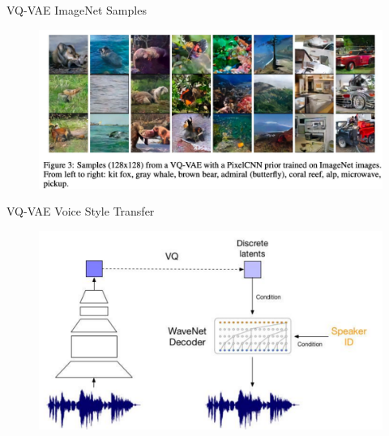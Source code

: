 \begin{frame}[allowframebreaks]{VQ-VAE ImageNet Samples}
\begin{figure}
        \centering
        \includegraphics[height=0.9\textheight, width=\textwidth, keepaspectratio]{images/vae/vq_vae_samples.PNG}
\end{figure}
\end{frame}


\begin{frame}[allowframebreaks]{VQ-VAE Voice Style Transfer}
\begin{figure}
        \centering
        \includegraphics[height=0.9\textheight, width=\textwidth, keepaspectratio]{images/vae/vq_vae_voice.PNG}
\end{figure}
\end{frame}

